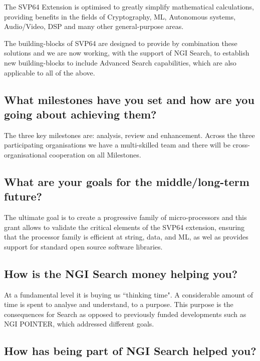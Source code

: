 The \acrshort{SVP64} Extension is optimised to greatly simplify mathematical calculations,
providing benefits in the fields of Cryptography, \acrshort{ML},
Autonomous systems, Audio/Video, \acrfull{DSP} and many other general-purpose areas.
 
The building-blocks of \acrshort{SVP64} are designed to provide by combination these
solutions and we are now working, with the support of \acrshort{NGI} Search, to
establish new building-blocks to include Advanced Search capabilities,
which are also applicable to all of the above.

\subsection{What milestones have you set and how are you going about achieving them?}

The three key milestones are: analysis, review and enhancement.
Across the three participating organisations we have a multi-skilled
team and there will be cross-organisational cooperation on all Milestones.

\subsection{What are your goals for the middle/long-term future?}

The ultimate goal is to create a progressive family of micro-processors
and this grant allows to validate the critical elements of the
\acrshort{SVP64} extension, ensuring that the processor family is efficient at string,
data, and \acrshort{ML}, as wel as provides support for standard open
source software libraries.

\subsection{How is the \acrshort{NGI} Search money helping you?}

At a fundamental level it is buying us ``thinking time".
A considerable amount of time is spent to analyse and understand,
to a purpose. This purpose is the consequences for Search as
opposed to previously funded developments such as \acrshort{NGI} POINTER,
which addressed different goals.

\subsection{How has being part of \acrshort{NGI} Search helped you?}

